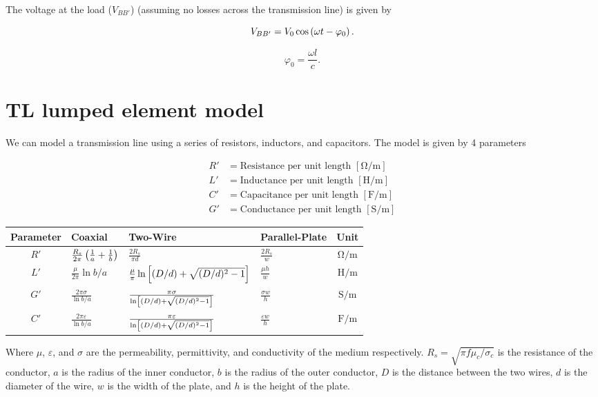 \documentclass{report}
\begin{document}
The voltage at the load ($V_{BB'}$) (assuming no losses across the transmission line) is given by

\[
	V_{BB'} = V_0 \cos \left( \omega t - \varphi_0 \right)
	.\]

\[
	\varphi_0 = \frac{\omega l}{c}
	.\]

\section{TL lumped element model}

We can model a transmission line using a series of resistors, inductors, and capacitors. The model is given by 4 parameters

\begin{align*}
	R' & = \text{Resistance per unit length } [\unit{\ohm\per\meter}]      \\
	L' & = \text{Inductance per unit length } [\unit{\henry\per\meter}]    \\
	C' & = \text{Capacitance per unit length } [\unit{\farad\per\meter}]   \\
	G' & = \text{Conductance per unit length } [\unit{\siemens\per\meter}]
\end{align*}

{
\renewcommand{\arraystretch}{2.5}
\everymath{\displaystyle}
\begin{table}[H]
	\centering
	\begin{tabularx}{\linewidth}{|c|YYYc|}
		\hline
		\textbf{Parameter} & \textbf{Coaxial}                                       & \textbf{Two-Wire}                                             & \textbf{Parallel-Plate}   & \textbf{Unit}               \\
		\hline
		$R'$               & $\frac{R_s}{2\pi} \left( \frac{1}{a} + \frac{1}{b} \right)$ & $\frac{2R_s}{\pi d}$                                          & $\frac{2R_s}{w}$          & $\unit{\ohm\per\meter}$     \\
		$L'$               & $\frac{\mu}{2\pi}\ln b/a $                             & $\frac{\mu}{\pi}\ln\left[ (D/d)+\sqrt{(D/d)^2-1} \right]$          & $\frac{\mu h}{w}$         & $\unit{\henry\per\meter}$   \\
		$G'$               & $\frac{2\pi \sigma}{\ln b/a}$                          & $\frac{\pi \sigma}{\ln\left[ (D/d)+\sqrt{(D/d)^2-1} \right]}$      & $\frac{\sigma w}{h}$      & $\unit{\siemens\per\meter}$ \\
		$C'$               & $\frac{2\pi \varepsilon}{\ln b/a}$                     & $\frac{\pi \varepsilon}{\ln\left[ (D/d)+\sqrt{(D/d)^2-1} \right]}$ & $\frac{\varepsilon w}{h}$ & $\unit{\farad\per\meter}$   \\
		\hline
	\end{tabularx}
\end{table}
}
Where $\mu$, $\varepsilon$, and $\sigma$ are the permeability, permittivity, and conductivity of the medium respectively. $R_s=\sqrt{\pi f \mu_c/\sigma_c}$ is the resistance of the conductor, $a$ is the radius of the inner conductor, $b$ is the radius of the outer conductor, $D$ is the distance between the two wires, $d$ is the diameter of the wire, $w$ is the width of the plate, and $h$ is the height of the plate.\\
\end{document}

